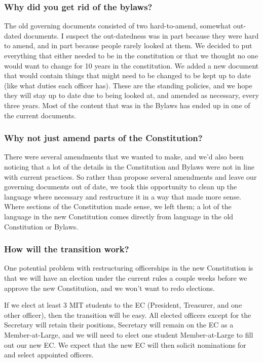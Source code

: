 \documentclass{article}
\begin{document}
\subsubsection*{Why did you get rid of the bylaws?}
The old governing documents consisted of two hard-to-amend, somewhat out-dated documents. I suspect the out-datedness was in part because they were hard to amend, and in part because people rarely looked at them. We decided to put everything that either needed to be in the constitution or that we thought no one would want to change for 10 years in the constitution. We added a new document that would contain things that might need to be changed to be kept up to date (like what duties each officer has). These are the standing policies, and we hope they will stay up to date due to being looked at, and amended as necessary, every three years. Most of the content that was in the Bylaws has ended up in one of the current documents.

\subsubsection*{Why not just amend parts of the Constitution?}
There were several amendments that we wanted to make, and we'd also been noticing that a lot of the details in the Constitution and Bylaws were not in line with current practices. So rather than propose several amendments and leave our governing documents out of date, we took this opportunity to clean up the language where necessary and restructure it in a way that made more sense. Where sections of the Constitution made sense, we left them; a lot of the language in the new Constitution comes directly from language in the old Constitution or Bylaws.

\subsubsection*{How will the transition work?}
One potential problem with restructuring officerships in the new Constitution is that we will have an election under the current rules a couple weeks before we approve the new Constitution, and we won't want to redo elections.

If we elect at least 3 MIT students to the EC (President, Treasurer, and one other officer), then the transition will be easy. All elected officers except for the Secretary will retain their positions, Secretary will remain on the EC as a Member-at-Large, and we will need to elect one student Member-at-Large to fill out our new EC. We expect that the new EC will then solicit nominations for and select appointed officers.
\end{document}
